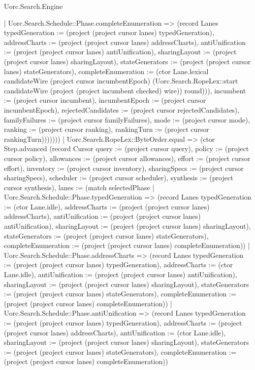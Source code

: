 \begin{lexlean}{Uorc.Search.Engine}
\begin{semanticmodule}
{{            | Uorc.Search.Schedule::Phase.completeEnumeration => (record Lanes {typedGeneration := (project (project cursor lanes) typedGeneration), addressCharts := (project (project cursor lanes) addressCharts), antiUnification := (project (project cursor lanes) antiUnification), sharingLayout := (project (project cursor lanes) sharingLayout), stateGenerators := (project (project cursor lanes) stateGenerators), completeEnumeration := (ctor Lane.lexical candidateWire (project cursor incumbentEpoch) (Uorc.Search.RopeLex::start candidateWire (project (project incumbent checked) wire)) round)})), incumbent := (project cursor incumbent), incumbentEpoch := (project cursor incumbentEpoch), rejectedCandidates := (project cursor rejectedCandidates), familyFailures := (project cursor familyFailures), mode := (project cursor mode), ranking := (project cursor ranking), rankingTurn := (project cursor rankingTurn)}))))))
        | Uorc.Search.RopeLex::ByteOrder.equal => (ctor Step.advanced (record Cursor {query := (project cursor query), policy := (project cursor policy), allowances := (project cursor allowances), effort := (project cursor effort), inventory := (project cursor inventory), sharingSpecs := (project cursor sharingSpecs), scheduler := (project cursor scheduler), synthesis := (project cursor synthesis), lanes := (match selectedPhase
          | Uorc.Search.Schedule::Phase.typedGeneration => (record Lanes {typedGeneration := (ctor Lane.idle), addressCharts := (project (project cursor lanes) addressCharts), antiUnification := (project (project cursor lanes) antiUnification), sharingLayout := (project (project cursor lanes) sharingLayout), stateGenerators := (project (project cursor lanes) stateGenerators), completeEnumeration := (project (project cursor lanes) completeEnumeration)})
          | Uorc.Search.Schedule::Phase.addressCharts => (record Lanes {typedGeneration := (project (project cursor lanes) typedGeneration), addressCharts := (ctor Lane.idle), antiUnification := (project (project cursor lanes) antiUnification), sharingLayout := (project (project cursor lanes) sharingLayout), stateGenerators := (project (project cursor lanes) stateGenerators), completeEnumeration := (project (project cursor lanes) completeEnumeration)})
          | Uorc.Search.Schedule::Phase.antiUnification => (record Lanes {typedGeneration := (project (project cursor lanes) typedGeneration), addressCharts := (project (project cursor lanes) addressCharts), antiUnification := (ctor Lane.idle), sharingLayout := (project (project cursor lanes) sharingLayout), stateGenerators := (project (project cursor lanes) stateGenerators), completeEnumeration := (project (project cursor lanes) completeEnumeration)})
}}
\end{semanticmodule}
\end{lexlean}
